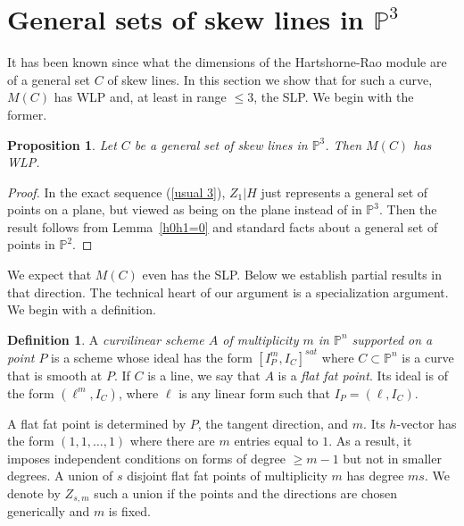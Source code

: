 \documentclass[12pt]{amsart}%
\numberwithin{equation}{section}
\newtheorem{proposition}[theorem]{Proposition}
\theoremstyle{definition}
\newtheorem{definition}[theorem]{Definition}
\numberwithin{equation}{section}
\newcommand{\PP}{ \ensuremath{\mathbb{P}}}
\begin{document}

\section{General sets of skew lines in $\mathbb P^3$}
\label{sec: general lines}


It has been known since \cite{HH} what the dimensions of the Hartshorne-Rao module are of a general set $C$ of skew lines. In this section we show that for such a curve, $M(C)$ has WLP and, at least in range $\leq 3$, the SLP. We begin with the former. 

\begin{proposition} \label{Prop:GenlWLP}
    Let $C$ be a general set of skew lines  in $\PP^3$. Then $M(C)$ has WLP.
\end{proposition}

\begin{proof}
    In the exact sequence (\ref{usual 3}), $Z_1|H$ just represents a general set of points on a plane, but viewed as being on the  plane instead of in $\PP^3$. Then the result follows from Lemma~\ref{h0h1=0} and standard facts about a general set of points in $\PP^2$.
\end{proof}

We expect that $M(C)$  even has the SLP. Below we establish partial results in that direction.  The technical heart of our argument is a specialization argument.  
We begin with a definition.

\begin{definition}
A {\it curvilinear scheme $A$ of multiplicity $m$ in $\mathbb P^n$ supported on a point $P$} is a scheme whose ideal has the form $[I_P^m,I_C]^{sat}$ where $C \subset \PP^n$ is a curve that is smooth at $P$. If $C$ is a line, we say that $A$ is a {\it flat fat point}. Its ideal is of the form $(\ell^m, I_C)$, where $\ell$ is any linear form such that $I_P = (\ell, I_C)$. 
\end{definition}

A flat fat point is determined by $P$, the tangent direction, and $m$. Its $h$-vector has the form $(1,1,\dots,1)$ where there are $m$ entries equal to $1$. As a result, it imposes independent conditions on forms of degree $\geq m-1$ but not in smaller degrees. A union of $s$ disjoint flat fat points of multiplicity $m$ has degree $ms$. We denote by $Z_{s,m}$ such a union if the points and the directions are chosen generically and $m$ is fixed.
\end{document}
